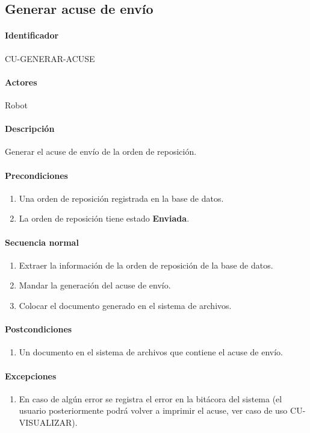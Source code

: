 \subsection{Generar acuse de envío}\label{cu-generar-acuse}
\paragraph{Identificador}
CU-GENERAR-ACUSE
\paragraph{Actores}
Robot
\paragraph{Descripción}
Generar el acuse de envío de la orden de reposición.
\paragraph{Precondiciones}
\begin{enumerate}
  \item Una orden de reposición registrada en la base de datos.
  \item La orden de reposición tiene estado \textbf{Enviada}.
\end{enumerate}
\paragraph{Secuencia normal}
\begin{enumerate}
  \item Extraer la información de la orden de reposición de la base de datos.
  \item Mandar la generación del acuse de envío.
  \item Colocar el documento generado en el sistema de archivos.
\end{enumerate}
\paragraph{Postcondiciones}
\begin{enumerate}
  \item Un documento en el sistema de archivos que contiene el acuse de envío.
\end{enumerate}
\paragraph{Excepciones}
\begin{enumerate}
  \item En caso de algún error se registra el error en la bitácora del sistema (el usuario posteriormente podrá volver a imprimir el acuse, ver caso de uso CU-VISUALIZAR).
\end{enumerate}


